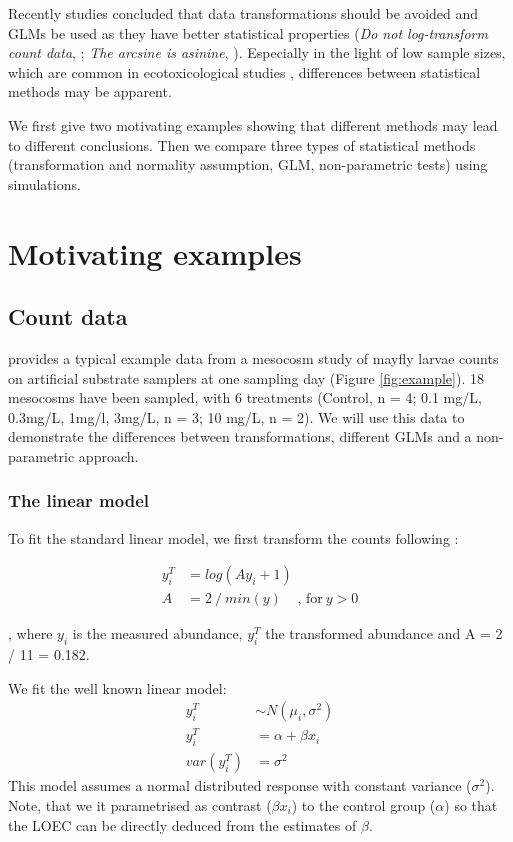 \documentclass{scrartcl}
\begin{document}
Recently studies concluded that data transformations should be avoided and GLMs be used as they have better statistical properties (\emph{Do not log-transform count data}, \citep{ohara_not_2010}; \emph{The arcsine is asinine}, \citep{warton_arcsine_2011}).
Especially in the light of low sample sizes, which are common in ecotoxicological studies \citep{sanderson_pesticide_2002,szocs_analysing_2015}, differences between statistical methods may be apparent. 

We first give two motivating examples showing that different methods may lead to different conclusions. 
Then we compare three types of statistical methods (transformation and normality assumption, GLM, non-parametric tests) using simulations.


\section{Motivating examples}
\subsection{Count data}
\citet{brock_minimum_2014} provides a typical example data from a mesocosm study of mayfly larvae counts on artificial substrate samplers at one sampling day (Figure \ref{fig:example}). 
18 mesocosms have been sampled, with 6 treatments (Control, n = 4; 0.1 mg/L, 0.3mg/L, 1mg/l, 3mg/L, n = 3; 10 mg/L, n = 2).
We will use this data to demonstrate the differences between transformations, different GLMs and a non-parametric approach.

\subsubsection{The linear model}
To fit the standard linear model, we first transform the counts following \citet{van_den_brink_impact_2000}:

\begin{align}
  y^T_i & = log(Ay_i + 1) \label{eqn:trans} \\
  A & = 2~/~min(y)~~~~~\text{, for}~ y > 0 \nonumber
\end{align}

, where $y_i$ is the measured abundance, $y_i^T$ the transformed abundance and A = 2 / 11 = 0.182.

We fit the well known linear model:
\begin{align}
  y_i^T &\sim N(\mu_i, \sigma^2) \nonumber \\
  y_i^T &= \alpha + \beta x_i \label{eqn:normal} \\
  var(y_i^T) &= \sigma^2 \nonumber
\end{align}
This model assumes a normal distributed response with constant variance ($\sigma^2$).
Note, that we it parametrised as contrast ($\beta x_i$) to the control group ($\alpha$) so that the LOEC can be directly deduced from the estimates of $\beta$.
\end{document}
